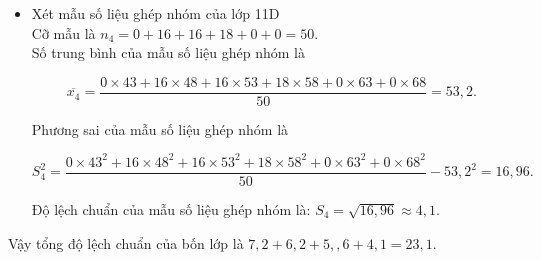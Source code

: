 \begin{ex}
{\begin{itemize}
		Độ lệch chuẩn của mẫu số liệu ghép nhóm là $S_3=\sqrt{30{,}96}\approx 5{,}6$.
	\item Xét mẫu số liệu ghép nhóm của lớp 11D\\
		
		Cỡ mẫu là $n_4=0+16+16+18+0+0=50$.\\
		
		Số trung bình của mẫu số liệu ghép nhóm là
		
		$$
		\overline{x_4}=\dfrac{0 \times 43+16 \times 48+16 \times 53+18 \times 58+0 \times 63+0 \times 68}{50}=53{,}2.
		$$
		
		Phương sai của mẫu số liệu ghép nhóm là
		
		$$
		S_4^2=\dfrac{0 \times 43^2+16 \times 48^2+16 \times 53^2+18 \times 58^2+0 \times 63^2+0 \times 68^2}{50}-53{,}2^2=16{,}96.
		$$
		
		Độ lệch chuẩn của mẫu số liệu ghép nhóm là: $S_4=\sqrt{16{,}96}\approx 4{,}1$.
		\end{itemize}
	Vậy tổng độ lệch chuẩn của bốn lớp là $7{,}2+6{,}2+5{,},6+4{,}1= 23{,}1$.
	}
\end{ex}

